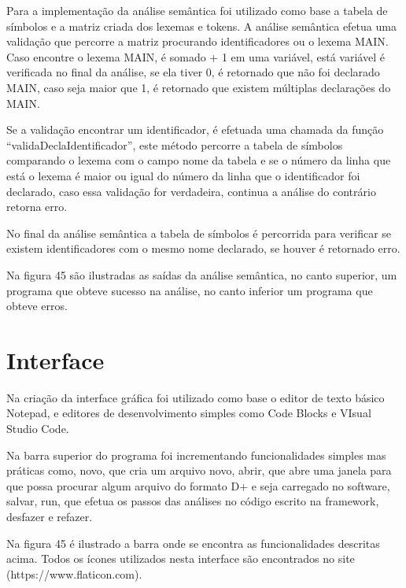 \documentclass[12pt,oneside,a4paper,chapter=TITLE,section=TITLE,sumario=tradicional]{abntex2}
\begin{document}
Para a implementação da análise semântica foi utilizado como base a tabela de símbolos e a matriz criada dos lexemas e tokens. A análise semântica efetua uma validação que percorre a matriz procurando identificadores ou o lexema MAIN. Caso encontre o lexema MAIN, é somado + 1 em uma variável, está variável é verificada no final da análise, se ela tiver 0, é retornado que não foi declarado MAIN, caso seja maior que 1, é retornado que existem múltiplas declarações do MAIN.

Se a validação encontrar um identificador, é efetuada uma chamada da função “validaDeclaIdentificador”, este método percorre a tabela de símbolos comparando o lexema com o campo nome da tabela e se o número da linha que está o lexema é maior ou igual do número da linha que o identificador foi declarado, caso essa validação for verdadeira, continua a análise do contrário retorna erro. 

No final da análise semântica a tabela de símbolos é percorrida para verificar se existem identificadores com o mesmo nome declarado, se houver é retornado erro.

Na figura 45 são ilustradas as saídas da análise semântica, no canto superior, um programa que obteve sucesso na análise, no canto inferior um programa que obteve erros.

\begin{figure}[htb]
\end{figure} 

\section{Interface}
\label{sec:interface}

Na criação da interface gráfica foi utilizado como base o editor de texto básico Notepad, e editores de desenvolvimento simples como Code Blocks e VIsual Studio Code. 

Na barra superior do programa foi incrementando funcionalidades simples mas práticas como, novo, que cria um arquivo novo, abrir, que abre uma janela para que possa procurar algum arquivo do formato D+ e seja carregado no software, salvar, run, que efetua os passos das análises no código escrito na framework, desfazer e refazer. 

Na figura 45 é ilustrado a barra onde se encontra as funcionalidades descritas acima. Todos os ícones utilizados nesta interface são encontrados no site (https://www.flaticon.com).
\end{document}

